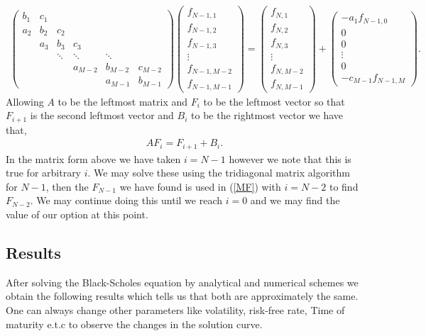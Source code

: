 \documentclass[12pt]{article}
\begin{document}
\begin{align*}
	\begin{pmatrix}
		b_{1} & c_{1} &&&&  \\
		a_{2} & b_{2} & c_2 &&&\\
		& a_{3} & b_{3} & c_3 &&\\
		&& \ddots & \ddots  & \ddots&\\
		&&& a_{M-2}&b_{M-2}&c_{M-2} \\
		&&&&a_{M-1}&b_{M-1} 
	\end{pmatrix}
	\begin{pmatrix}
		f_{N-1,1} \\
		f_{N-1,2} \\
		f_{N-1,3} \\
		\vdots \\
		f_{N-1,M-2}  \\
		f_{N-1,M-1}
	\end{pmatrix}
	= 
	\begin{pmatrix}
		f_{N,1} \\
		f_{N,2} \\
		f_{N,3} \\
		\vdots \\
		f_{N,M-2}  \\
		f_{N,M-1}
	\end{pmatrix}
	+ 
	\begin{pmatrix}
		-a_1f_{N-1,0} \\
		0 \\
		0 \\
		\vdots \\
		0  \\
		-c_{M-1}f_{N-1,M}
	\end{pmatrix}.
\end{align*}
Allowing $A$ to be the leftmost matrix and $F_i$ to be the leftmost vector so that $F_{i+1}$ is the second leftmost vector and $B_i$ to be the rightmost vector we have that,
\begin{align}
	AF_i = F_{i+1} + B_i. \label{MF}
\end{align}
In the matrix form above we have taken $i=N-1$ however we note that this is true for arbitrary $i$.
We may solve these using the tridiagonal matrix algorithm for $N-1$, then the $F_{N-1}$ we have found is used in (\ref{MF}) with $i=N-2$ to find $F_{N-2}$. We may continue doing this until we reach $i=0$ and we may find the value of our option at this point.


\subsection{Results}
 After solving the Black-Scholes equation by analytical and numerical schemes we obtain the following results which tells us that both are approximately the same. One can always change other parameters like volatility, risk-free rate, Time of maturity e.t.c to observe the changes in the solution curve.
 
\end{document}
